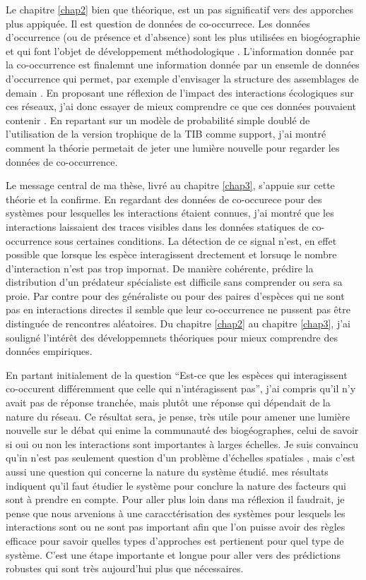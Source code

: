 Le chapitre \ref{chap2} bien que théorique, est un pas significatif vers
des apporches plus appiquée. Il est question de données de co-occurrece.
Les données d'occurrence (ou de présence et d'absence) sont les plus
utilisées en biogéographie et qui font l'objet de développement
méthodologique \citep{Elith2006, Phillips2006}. L'information donnée par
la co-occurrence est finalemnt une information donnée par un ensemle de
données d'occurrence qui permet, par exemple d'envisager la structure
des assemblages de demain \citep{Albouy2012}. En proposant une réflexion
de l'impact des interactions écologiques sur ces réseaux, j'ai donc
essayer de mieux comprendre ce que ces données pouvaient contenir
\citep[ce qui est un travail capital comme le souligne][]{Godsoe2010a}.
En repartant sur un modèle de probabilité simple doublé de l'utilisation
de la version trophique de la TIB \citep{Gravel2011} comme support, j'ai
montré comment la théorie permetait de jeter une lumière nouvelle pour
regarder les données de co-occurrence.

Le message central de ma thèse, livré au chapitre \ref{chap3}, s'appuie
sur cette théorie et la confirme. En regardant des données de
co-occurece pour des systèmes pour lesquelles les interactions étaient
connues, j'ai montré que les interactions laissaient des traces visibles
dans les données statiques de co-occurrence sous certaines conditions.
La détection de ce signal n'est, en effet possible que lorsque les
espèce interagissent drectement et lorsuqe le nombre d'interaction n'est
pas trop impornat. De manière cohérente, prédire la distribution d'un
prédateur spécialiste est difficile sans comprender ou sera sa proie.
Par contre pour des généraliste ou pour des paires d'espèces qui ne sont
pas en interactions directes il semble que leur co-occurrence ne pussent
pas être distinguée de rencontres aléatoires. Du chapitre \ref{chap2} au
chapitre \ref{chap3}, j'ai souligné l'intérêt des développemnets
théoriques pour mieux comprendre des données empiriques.

En partant initialement de la question ``Est-ce que les espèces qui
interagissent co-occurent différemment que celle qui n'intéragissent
pas'', j'ai compris qu'il n'y avait pas de réponse tranchée, mais plutôt
une réponse qui dépendait de la nature du réseau. Ce résultat sera, je
pense, très utile pour amener une lumière nouvelle sur le débat qui
enime la communauté des biogéographes, celui de savoir si oui ou non les
interactions sont importantes à larges échelles. Je suis convaincu qu'in
n'est pas seulement question d'un problème d'échelles spatiales
\citep{Araujo2014, Belmaker2015}, mais c'est aussi une question qui
concerne la nature du système étudié. mes résultats indiquent qu'il faut
étudier le système pour conclure la nature des facteurs qui sont à
prendre en compte. Pour aller plus loin dans ma réflexion il faudrait,
je pense que nous arvenions à une caracctérisation des systèmes pour
lesquels les interactions sont ou ne sont pas important afin que l'on
puisse avoir des règles efficace pour savoir quelles types d'approches
est pertienent pour quel type de système. C'est une étape importante et
longue pour aller vers des prédictions robustes qui sont très
aujourd'hui plus que nécessaires.

